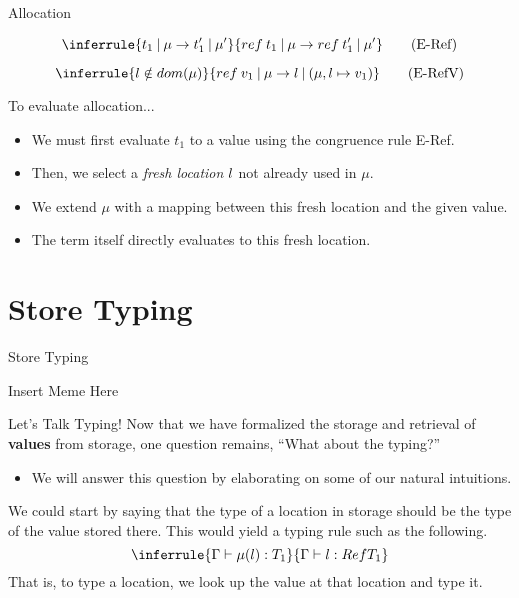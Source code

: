 \documentclass[11pt]{beamer}
\begin{document}
\begin{frame}[fragile=singleslide]{Allocation}

\begin{equation}
\inferrule{t_1\:|\:\mu \rightarrow t_1'\:|\:\mu'}{ref\:t_1\:|\:\mu \rightarrow ref\: t_1'\:|\:\mu'} \tag{E-Ref}
\end{equation}

\begin{equation}
\inferrule{\mathnormal{l} \notin dom(\mu)}{ref\:v_1\:|\:\mu \rightarrow \mathnormal{l}\:|\:(\mu, \mathnormal{l} \mapsto v_1)} \tag{E-RefV}
\end{equation}

To evaluate allocation...
\begin{itemize}
\item We must first evaluate $t_1$ to a value using the congruence rule E-Ref.
\item Then, we select a \emph{fresh location} $\mathnormal{l}$ not already used in $\mu$.
\item We extend $\mu$ with a mapping between this fresh location and the given value.
\item The term itself directly evaluates to this fresh location.  
\end{itemize}

\end{frame}


\section[Typing]{Store Typing}
\begin{frame}[fragile=singleslide]{Store Typing}
\begin{center}
Insert Meme Here
\end{center}
\end{frame}


\begin{frame}[fragile=singleslide]{Let's Talk Typing!}
Now that we have formalized the storage and retrieval of \textbf{values} from storage, one question remains, ``What about the typing?''
\begin{itemize}
\item We will answer this question by elaborating on some of our natural intuitions.  
\end{itemize}
We could start by saying that the type of a location in storage should be the type of the value stored there.  This would yield a typing rule such as the following.
\begin{equation}
\inferrule{\Gamma \vdash \mu(\mathnormal{l}) : T_1}{\Gamma \vdash \mathnormal{l} : Ref T_1} 
\end{equation}
That is, to type a location, we look up the value at that location and type it.  
\end{frame}
\end{document}
